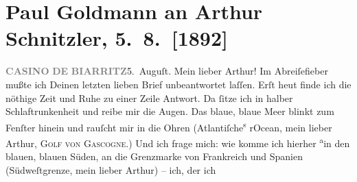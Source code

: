 

         
         \newcommand{\erwaehntePersonen}{Personen: Richard Beer-Hofmann, Fedor Mamroth}
         \newcommand{\erwaehnteInstitutionen}{Institutionen: Casino de Biarritz}
         \newcommand{\erwaehnteOrte}{Orte: Atlantischer Ozean, Biarritz, Biskaya, Café Pfob, Cauterets, Faberhäuser, Frankreich, Pau, Pyrenees, Salzburg, San Sebastian, Spanien, Wien}
         \newcommand{\erwaehnteWerke}{Werke: Aus der Kaffeehausecke, Gespräch, welches in der Kaffeehausecke nach Vorlesung der »Elixiere« geführt wird, Tagebuch}
               \section[Paul Goldmann an Arthur Schnitzler, 5. 8. {[}1892{]}]{ Paul Goldmann an Arthur Schnitzler, 5. 8. {[}1892{]}}\nopagebreak{}\rehead{ }\begin{ledgroupsized}[t]{13cm}\normalsize\beginnumbering \toendnotes[C]{\smallbreak\pagebreak[2]} 
\toendnotes[C]{\smallbreak}\pstart
           \noindent{}{\pb}\textcolor{gray}{\textbf{CASINO}}\pend
           \pstart
           \textcolor{gray}{\textbf{DE}}\pend
           \pstart
           \textcolor{gray}{\textbf{BIARRITZ}}\hfill 5. Auguſt. \pend
           \pstart\center{}Mein lieber Arthur!\pend\pstart
           Im Abreiſefieber mußte ich Deinen letzten lieben Brief unbeantwortet laſſen. Erſt
                  heut finde ich die nöthige Zeit und Ruhe zu einer
               Zeile Antwort. Da ſitze ich in halber Schlaftrunkenheit und reibe mir die Augen. Das
               blaue, blaue Meer blinkt zum Fenſter hinein und rauſcht mir in die Ohren (Atlantiſche\substVorne{}\textsuperscript{s }\substDazwischen{}r\substHinten{}{ }{\pb}Ocean, mein lieber Arthur, \textsc{Golf von Gascogne}.) Und ich frage mich: wie  komme ich hierher \substVorne{}\textsuperscript{a}\substDazwischen{}in\substHinten{} den blauen, blauen Süden,  an die
               Grenzmarke von Frankreich und Spanien (Südweſtgrenze, mein lieber Arthur) – ich, der ich \label{K_L02701-44v}
\end{ledgroupsized}
